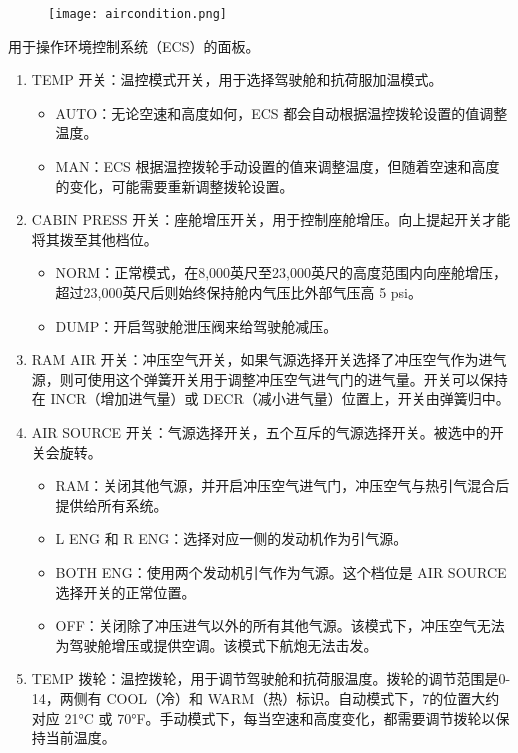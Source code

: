 \begin{figure}[htb]
	\centering
	\texttt{[image: aircondition.png]}
\end{figure}
用于操作环境控制系统（ECS）的面板。

\begin{enumerate}
	\item TEMP 开关：温控模式开关，用于选择驾驶舱和抗荷服加温模式。
	      \begin{itemize}
		      \item AUTO：无论空速和高度如何，ECS 都会自动根据温控拨轮设置的值调整温度。
		      \item MAN：ECS 根据温控拨轮手动设置的值来调整温度，但随着空速和高度的变化，可能需要重新调整拨轮设置。
	      \end{itemize}
	\item CABIN PRESS 开关：座舱增压开关，用于控制座舱增压。向上提起开关才能将其拨至其他档位。
	      \begin{itemize}
		      \item NORM：正常模式，在8,000英尺至23,000英尺的高度范围内向座舱增压，超过23,000英尺后则始终保持舱内气压比外部气压高 5 psi。
		      \item DUMP：开启驾驶舱泄压阀来给驾驶舱减压。
	      \end{itemize}
	\item RAM AIR 开关：冲压空气开关，如果气源选择开关选择了冲压空气作为进气源，则可使用这个弹簧开关用于调整冲压空气进气门的进气量。开关可以保持在 INCR（增加进气量）或 DECR（减小进气量）位置上，开关由弹簧归中。
	\item AIR SOURCE 开关：气源选择开关，五个互斥的气源选择开关。被选中的开关会旋转。
	      \begin{itemize}
		      \item RAM：关闭其他气源，并开启冲压空气进气门，冲压空气与热引气混合后提供给所有系统。
		      \item L ENG 和 R ENG：选择对应一侧的发动机作为引气源。
		      \item BOTH ENG：使用两个发动机引气作为气源。这个档位是 AIR SOURCE 选择开关的正常位置。
		      \item OFF：关闭除了冲压进气以外的所有其他气源。该模式下，冲压空气无法为驾驶舱增压或提供空调。该模式下航炮无法击发。
	      \end{itemize}
	\item TEMP 拨轮：温控拨轮，用于调节驾驶舱和抗荷服温度。拨轮的调节范围是0-14，两侧有 COOL（冷）和 WARM（热）标识。自动模式下，7的位置大约对应 21°C 或 70°F。手动模式下，每当空速和高度变化，都需要调节拨轮以保持当前温度。
\end{enumerate}


